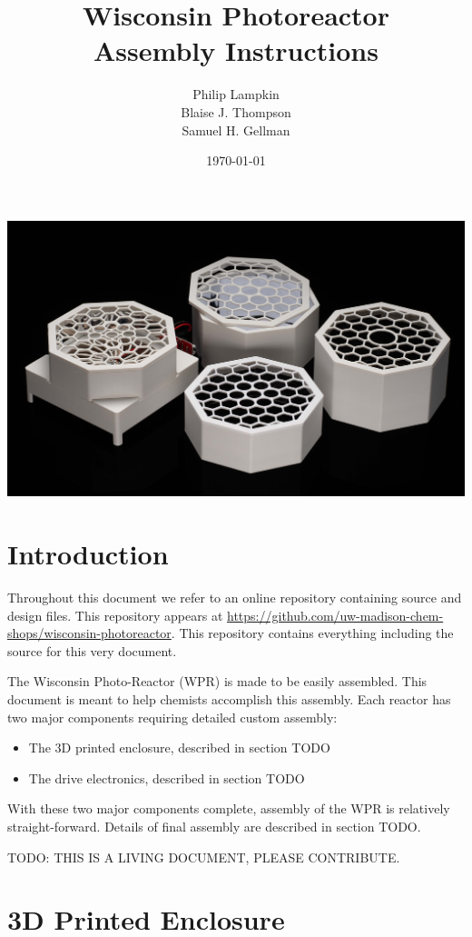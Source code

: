 \documentclass[11pt]{article}
\title{Wisconsin Photoreactor \\ Assembly Instructions}
\author{
  Philip Lampkin \\
  Blaise J. Thompson \\
  Samuel H. Gellman
  }
\date{\today}
\let\stdsection\section
\renewcommand\section{\clearpage\stdsection}
\begin{document}
\maketitle

\includegraphics[width=\textwidth]{"../coverart.jpg"}

\tableofcontents

\section{Introduction}

Throughout this document we refer to an online repository containing source and design files.
This repository appears at \url{https://github.com/uw-madison-chem-shops/wisconsin-photoreactor}.
This repository contains everything including the source for this very document.

The Wisconsin Photo-Reactor (WPR) is made to be easily assembled.
This document is meant to help chemists accomplish this assembly.
Each reactor has two major components requiring detailed custom assembly:

\begin{itemize}
  \item The 3D printed enclosure, described in section TODO
  \item The drive electronics, described in section TODO
\end{itemize}

With these two major components complete, assembly of the WPR is relatively straight-forward.
Details of final assembly are described in section TODO.

TODO: THIS IS A LIVING DOCUMENT, PLEASE CONTRIBUTE.

\section{3D Printed Enclosure}
\end{document}
